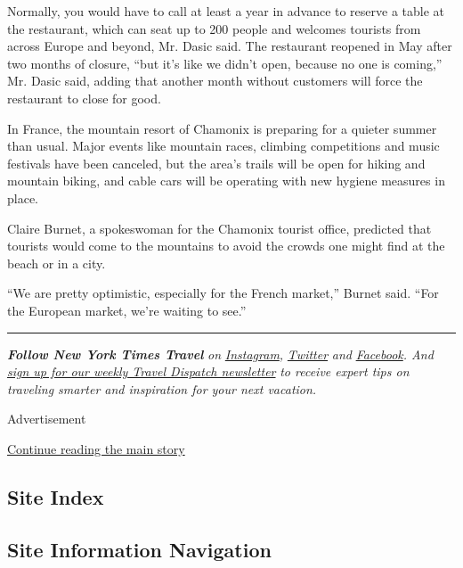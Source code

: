 Normally, you would have to call at least a year in advance to reserve a
table at the restaurant, which can seat up to 200 people and welcomes
tourists from across Europe and beyond, Mr. Dasic said. The restaurant
reopened in May after two months of closure, ``but it's like we didn't
open, because no one is coming,'' Mr. Dasic said, adding that another
month without customers will force the restaurant to close for good.

In France, the mountain resort of Chamonix is preparing for a quieter
summer than usual. Major events like mountain races, climbing
competitions and music festivals have been canceled, but the area's
trails will be open for hiking and mountain biking, and cable cars will
be operating with new hygiene measures in place.

Claire Burnet, a spokeswoman for the Chamonix tourist office, predicted
that tourists would come to the mountains to avoid the crowds one might
find at the beach or in a city.

``We are pretty optimistic, especially for the French market,'' Burnet
said. ``For the European market, we're waiting to see.''

\begin{center}\rule{0.5\linewidth}{\linethickness}\end{center}

\emph{\textbf{Follow New York Times Travel}} \emph{on}
\href{https://www.instagram.com/nytimestravel/}{\emph{Instagram}}\emph{,}
\href{https://twitter.com/nytimestravel}{\emph{Twitter}} \emph{and}
\href{https://www.facebookcorewwwi.onion/nytimestravel/}{\emph{Facebook}}\emph{.
And}
\href{https://www.nytimes3xbfgragh.onion/newsletters/traveldispatch}{\emph{sign
up for our weekly Travel Dispatch newsletter}} \emph{to receive expert
tips on traveling smarter and inspiration for your next vacation.}

Advertisement

\protect\hyperlink{after-bottom}{Continue reading the main story}

\hypertarget{site-index}{%
\subsection{Site Index}\label{site-index}}

\hypertarget{site-information-navigation}{%
\subsection{Site Information
Navigation}\label{site-information-navigation}}

